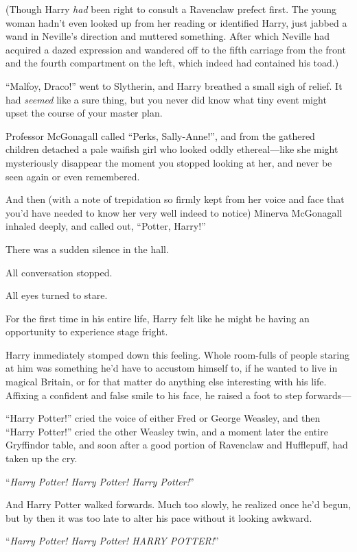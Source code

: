 (Though Harry \emph{had} been right to consult a Ravenclaw prefect first. The
young woman hadn’t even looked up from her reading or identified Harry, just
jabbed a wand in Neville’s direction and muttered something. After which
Neville had acquired a dazed expression and wandered off to the fifth carriage
from the front and the fourth compartment on the left, which indeed had
contained his toad.)

“Malfoy, Draco!” went to Slytherin, and Harry breathed a small sigh of relief.
It had \emph{seemed} like a sure thing, but you never did know what tiny event
might upset the course of your master plan.

Professor McGonagall called “Perks, Sally-Anne!”, and from the gathered
children detached a pale waifish girl who looked oddly ethereal—like she
might mysteriously disappear the moment you stopped looking at her, and never
be seen again or even remembered.

And then (with a note of trepidation so firmly kept from her voice and face
that you’d have needed to know her very well indeed to notice) Minerva
McGonagall inhaled deeply, and called out, “Potter, Harry!”

There was a sudden silence in the hall.

All conversation stopped.

All eyes turned to stare.

For the first time in his entire life, Harry felt like he might be having an
opportunity to experience stage fright.

Harry immediately stomped down this feeling. Whole room-fulls of people staring
at him was something he’d have to accustom himself to, if he wanted to live in
magical Britain, or for that matter do anything else interesting with his life.
Affixing a confident and false smile to his face, he raised a foot to step
forwards—

“Harry Potter!” cried the voice of either Fred or George Weasley, and then
“Harry Potter!” cried the other Weasley twin, and a moment later the entire
Gryffindor table, and soon after a good portion of Ravenclaw and Hufflepuff,
had taken up the cry.

“\emph{Harry Potter! Harry Potter! Harry Potter!}”

And Harry Potter walked forwards. Much too slowly, he realized once he’d begun,
but by then it was too late to alter his pace without it looking awkward.

\later

“\emph{Harry Potter! Harry Potter! HARRY POTTER!}”

